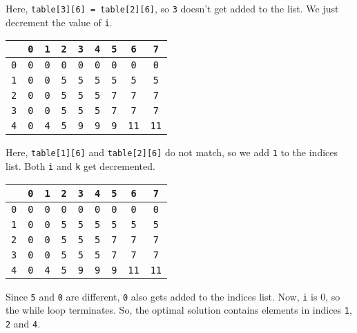 \documentclass[a4paper, openany]{memoir}
\begin{document}
Here, \texttt{table[3][6] = table[2][6]}, so \texttt{3} doesn't get added to the list. We just decrement the value of \texttt{i}.
\begin{center}
    \begin{tabular}{|c|c|c|c|c|c|c|c|c|}
        \hline
         & \texttt{0} & \texttt{1} & \texttt{2} & \texttt{3} & \texttt{4} & \texttt{5} & \texttt{6} & \texttt{7} \\
        \hline
        \texttt{0} & \texttt{0} & \texttt{0} & \texttt{0} & \texttt{0} & \texttt{0} & \texttt{0} & \texttt{0} & \texttt{0} \\
        \hline
        \texttt{1} & \texttt{0} & \texttt{0} & \texttt{5} & \texttt{5} & \texttt{5} & \texttt{5} & \texttt{\color{blue}5} & \texttt{5} \\
        \hline
        \texttt{2} & \texttt{0} & \texttt{0} & \texttt{5} & \texttt{5} & \texttt{5} & \texttt{7} & \texttt{\color{red}7} & \texttt{7} \\
        \hline
        \texttt{3} & \texttt{0} & \texttt{0} & \texttt{5} & \texttt{5} & \texttt{5} & \texttt{7} & \texttt{7} & \texttt{7} \\
        \hline
        \texttt{4} & \texttt{0} & \texttt{4} & \texttt{5} & \texttt{9} & \texttt{9} & \texttt{9} & \texttt{11} &  \texttt{11} \\
        \hline
    \end{tabular}
\end{center}
Here, \texttt{table[1][6]} and \texttt{table[2][6]} do not match, so we add \texttt{1} to the indices list. Both \texttt{i} and \texttt{k} get decremented.
\begin{center}
    \begin{tabular}{|c|c|c|c|c|c|c|c|c|}
        \hline
         & \texttt{0} & \texttt{1} & \texttt{2} & \texttt{3} & \texttt{4} & \texttt{5} & \texttt{6} & \texttt{7} \\
        \hline
        \texttt{0} & \texttt{0} & \texttt{0} & \texttt{0} & \texttt{\color{blue}0} & \texttt{0} & \texttt{0} & \texttt{0} & \texttt{0} \\
        \hline
        \texttt{1} & \texttt{0} & \texttt{0} & \texttt{5} & \texttt{\color{red}5} & \texttt{5} & \texttt{5} & \texttt{5} & \texttt{5} \\
        \hline
        \texttt{2} & \texttt{0} & \texttt{0} & \texttt{5} & \texttt{5} & \texttt{5} & \texttt{7} & \texttt{7} & \texttt{7} \\
        \hline
        \texttt{3} & \texttt{0} & \texttt{0} & \texttt{5} & \texttt{5} & \texttt{5} & \texttt{7} & \texttt{7} & \texttt{7} \\
        \hline
        \texttt{4} & \texttt{0} & \texttt{4} & \texttt{5} & \texttt{9} & \texttt{9} & \texttt{9} & \texttt{11} &  \texttt{11} \\
        \hline
    \end{tabular}
\end{center}
Since \texttt{5} and \texttt{0} are different, \texttt{0} also gets added to the indices list. Now, \texttt{i} is 0, so the while loop terminates. So, the optimal solution contains elements in indices \texttt{1}, \texttt{2} and \texttt{4}.
\end{document}
